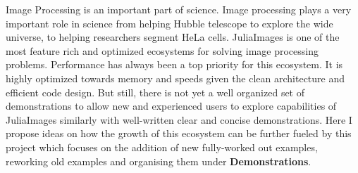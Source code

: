 \documentclass[10pt, twoside]{extarticle}
\begin{document}
\vspace{0.5cm}
\large
Image Processing is an important part of science. Image processing plays a very important role in science from helping Hubble telescope to explore the wide universe, to helping researchers segment HeLa cells. JuliaImages is one of the most feature rich and optimized ecosystems for solving image processing problems. Performance has always been a top priority for this ecosystem. It is highly optimized towards memory and speeds given the clean architecture and efficient code design. But still, there is not yet a well organized set of demonstrations to allow new and experienced users to explore capabilities of JuliaImages similarly with well-written clear and concise demonstrations. Here I propose ideas on how the 
growth of this ecosystem can be further fueled by this project which focuses on the addition of new fully-worked out examples, reworking old examples and organising them under \textbf{Demonstrations}.



\newpage




\end{document}
